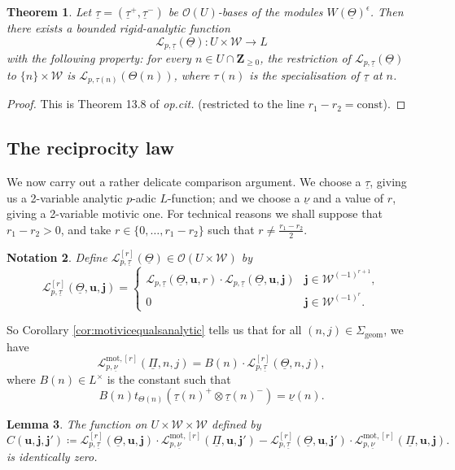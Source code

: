 \documentclass[cjm]{ipart}
\theoremstyle{plain}
\newtheorem{theorem}{Theorem}[subsection]
\newtheorem{lemma}[theorem]{Lemma}
\newtheorem{notation}[theorem]{Notation}
\theoremstyle{remark}
\newcommand{\ZZ}{\mathbf{Z}}
\newcommand{\bfj}{\mathbf{j}}
\newcommand{\cL}{\mathcal{L}}
\newcommand{\cO}{\mathcal{O}}
\newcommand{\cW}{\mathcal{W}}
\newcommand{\uPi}{\underline{\Pi}}
\newcommand{\uTh}{\underline{\Theta}}
\newcommand{\unu}{\underline{\nu}}
\newcommand{\utau}{\underline{\tau}}
\numberwithin{equation}{subsection}
\renewcommand{\ge}{\geqslant}
\begin{document}
  \begin{theorem}
   \label{thm:gl4famL}
   Let $\utau = (\utau^+, \utau^-)$ be $\cO(U)$-bases of the modules $W(\uTh)^{\epsilon}$. Then there exists a bounded rigid-analytic function
   \[ \cL_{p, \utau}(\uTh): U \times \cW \to L \]
   with the following property: for every $n \in U \cap \ZZ_{\ge 0}$, the restriction of $\cL_{p, \utau}(\uTh)$ to $\{n \} \times \cW$ is $\cL_{p, \tau(n)}(\Theta(n))$, where $\tau(n)$ is the specialisation of $\utau$ at $n$.
  \end{theorem}
  
  \begin{proof}
   This is Theorem 13.8 of \emph{op.cit.} (restricted to the line $r_1 - r_2 = \text{const}$).
  \end{proof}

 \subsection{The reciprocity law}

  We now carry out a rather delicate comparison argument. We choose a $\utau$, giving us a 2-variable analytic $p$-adic $L$-function; and we choose a $\unu$ and a value of $r$, giving a 2-variable motivic one. For technical reasons we shall suppose that $r_1 -r_2 > 0$, and take $r \in \{0, \dots, r_1 - r_2\}$ such that
  \( r \ne \frac{r_1 - r_2}{2}. \)

  \begin{notation}
   Define $\cL^{[r]}_{p, \utau}(\uTh) \in \cO(U \times \cW)$ by
   \[ \cL^{[r]}_{p, \utau}(\uTh,\mathbf{u}, \bfj) =
   \begin{cases}
    \cL_{p, \utau}(\uTh, \mathbf{u}, r) \cdot\cL_{p, \utau}(\uTh, \mathbf{u}, \bfj) & \bfj \in \cW^{(-1)^{r+1}}, \\
    0 & \bfj \in \cW^{(-1)^r}.
   \end{cases} \]
  \end{notation}

  So Corollary \ref{cor:motivicequalsanalytic} tells us that for all $(n, j) \in \Sigma_{\mathrm{geom}}$, we have
  \begin{equation}
  \label{eq:defBn}
  \cL^{\mathrm{mot}, [r]}_{p, \unu}(\uPi, n, j) = B(n) \cdot \cL^{[r]}_{p, \utau}(\uTh, n, j),
  \end{equation}
  where $B(n) \in L^\times$ is the constant such that
  \[
  B(n) t_{\Theta(n)}\left( \utau(n)^+ \otimes \utau(n)^-\right) =   \unu(n).
  \]

  \begin{lemma}
   The function on $U \times \cW\times\cW$ defined by
   \[ C(\mathbf{u}, \bfj, \bfj') \coloneqq
   \cL^{[r]}_{p, \utau}(\uTh, \mathbf{u}, \bfj) \cdot \cL^{\mathrm{mot}, [r]}_{p, \unu}(\uPi, \mathbf{u}, \bfj')- \cL^{[r]}_{p, \utau}(\uTh, \mathbf{u}, \bfj')\cdot \cL^{\mathrm{mot}, [r]}_{p, \unu}(\uPi, \mathbf{u}, \bfj).
   \]
   is identically zero.
  \end{lemma}
\end{document}
